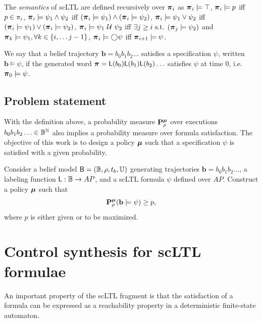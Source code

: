 \documentclass{ifacconf}
\begin{document}
\begin{definition}
 The \emph{semantics} of scLTL are defined recursively  over ${\boldsymbol{\pi}}_i$ as
    ${\boldsymbol{\pi}}_i \models \top$,
    ${\boldsymbol{\pi}}_i \models p$ iff $p \in \pi_i$,
    ${\boldsymbol{\pi}}_i \models \psi_1 \wedge  \psi_2  $ iff $ ( {\boldsymbol{\pi}}_i \models \psi_1 ) \wedge ( {\boldsymbol{\pi}}_i \models \psi_2 ) $,
    ${\boldsymbol{\pi}}_i \models \psi_1 \vee  \psi_2  $ iff $ ( {\boldsymbol{\pi}}_i \models \psi_1 ) \vee ( {\boldsymbol{\pi}}_i \models \psi_2 ) $,
    ${\boldsymbol{\pi}}_i \models  \psi_1 \ \mathcal{U}\  \psi_2 $ iff $\exists j \geq i \text{ s.t. } ({\boldsymbol{\pi}}_j \models \psi_2 ) $ and ${\boldsymbol{\pi}}_k \models \psi_1, \forall k \in \{i, \ldots j-1\}$,
    ${\boldsymbol{\pi}}_i \models \bigcirc \psi$ iff ${\boldsymbol{\pi}}_{i+1} \models \psi$.
\end{definition}

We say that a belief trajectory $\mathbf{b} = b_0 b_1 b_2 \ldots$ satisfies a specification $\psi$, written $\mathbf{b} \models \psi$, if the generated word ${\boldsymbol{\pi}} =\mathsf{L}(b_0) \mathsf{L}(b_1) \mathsf{L}(b_2) \ldots$ satisfies $\psi$ at time 0, i.e. ${\boldsymbol{\pi}}_0 \models \psi$.


\subsection{Problem statement}

With the definition above, a probability measure $\mathbf{P}_\rho^{\boldsymbol{\mu}}$ over executions $b_0 b_1 b_2 \ldots\in \mathbb{B}^{\mathbb N}$ also implies a probability measure over formula satisfaction. The objective of this work is to design a policy ${\boldsymbol{\mu}}$ such that a specification $\psi$ is satisfied with a given probability.

\begin{problem}
\label{prob:main}
  Consider a belief model $\mathsf{B} = (\mathbb{B}, \rho, t_b, {\mathbb{U}})$ generating trajectories $\mathbf{b} = b_0 b_1 b_2 \ldots$, a labeling function $\mathsf{L} : \mathbb{B} \rightarrow AP$, and a scLTL formula $\psi$ defined over $AP$. Construct a policy ${\boldsymbol{\mu}}$ such that
  \begin{equation}
    \mathbf{P}_\rho^{\boldsymbol{\mu}} ( \mathbf{b} \models \psi )\geq p,
  \end{equation}
  where $p$ is either given or to be maximized.
\end{problem}


\section{Control synthesis for scLTL formulae}
\label{sec:exact_synth}

An important property of the scLTL fragment is that the satisfaction of a formula can be expressed as a reachability property in a deterministic finite-state automaton.
\end{document}
